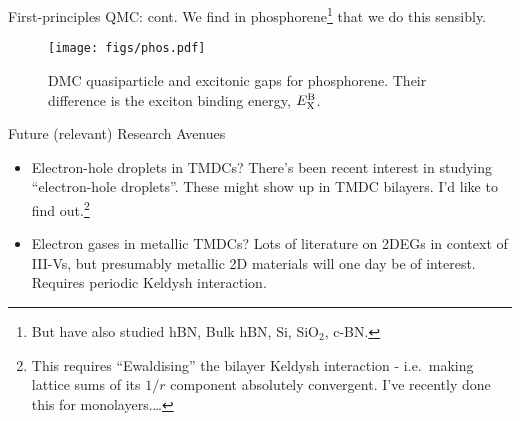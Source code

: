 \documentclass[12pt, pdf, hyperref={draft}, usenames, dvipsnames]{beamer}
\newcommand{\green}[1]{{\bf\color{ForestGreen}{#1}}}
\begin{document}
\begin{frame}{First-principles QMC\@: cont.}
We find in phosphorene\footnote{But have also studied hBN, Bulk hBN, Si,
SiO$_2$, c-BN.} that we \green{can} do this sensibly.

\begin{figure}[H]
  \centering
  \texttt{[image: figs/phos.pdf]}
  \caption{DMC quasiparticle and excitonic gaps for phosphorene. Their
  difference is the exciton binding energy, $E^{\rm B}_{\rm X}$.}
\label{fig:phos}
\end{figure}

\end{frame}


\begin{frame}{Future (relevant) Research Avenues}

\begin{itemize}

  \item Electron-hole droplets in TMDCs? There's been recent interest in
  studying ``electron-hole droplets''.
  These might show up in TMDC bilayers. I'd like to find out.\footnote{This
  requires ``Ewaldising'' the bilayer Keldysh interaction - i.e.\ making
  lattice sums of its $1/r$ component absolutely convergent. I've recently done
  this for monolayers.\ldots}

  \item Electron gases in metallic TMDCs? Lots of literature on 2DEGs in
  context of III-Vs, but presumably metallic 2D materials will one day be
  of interest. Requires periodic Keldysh interaction.

\end{itemize}
\end{frame}
\end{document}
